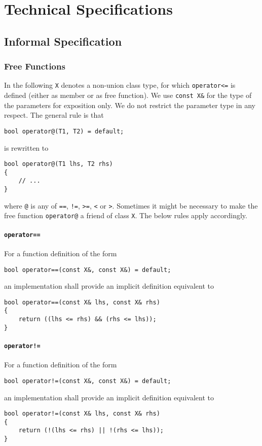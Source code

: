 ﻿\documentclass[a4paper,11pt,final]{article}
\numberwithin{equation}{subsection}
\begin{document}
\section{Technical Specifications}
\subsection{Informal Specification}
\subsubsection{Free Functions}
In the following \verb|X| denotes a non-union class type, for which \verb|operator<=| is defined (either as member or as free function). We use \verb|const X&| for the type of the parameters for exposition only. We do not restrict the parameter type in any respect. The general rule is that
\begin{verbatim}
bool operator@(T1, T2) = default;
\end{verbatim}
is rewritten to
\begin{verbatim}
bool operator@(T1 lhs, T2 rhs)
{
    // ...
}
\end{verbatim}
where \verb|@| is any of \verb|==|, \verb|!=|, \verb|>=|, \verb|<| or \verb|>|. Sometimes it might be necessary to make the free function \verb|operator@| a friend of class \verb|X|. The below rules apply accordingly.

\paragraph{\texttt{operator==}}
For a function definition of the form
\begin{verbatim}
bool operator==(const X&, const X&) = default;
\end{verbatim}
an implementation shall provide an implicit definition equivalent to
\begin{verbatim}
bool operator==(const X& lhs, const X& rhs)
{
    return ((lhs <= rhs) && (rhs <= lhs));
}
\end{verbatim}

\paragraph{\texttt{operator!=}}
For a function definition of the form
\begin{verbatim}
bool operator!=(const X&, const X&) = default;
\end{verbatim}
an implementation shall provide an implicit definition equivalent to
\begin{verbatim}
bool operator!=(const X& lhs, const X& rhs)
{
    return (!(lhs <= rhs) || !(rhs <= lhs));
}
\end{verbatim}
\end{document}
